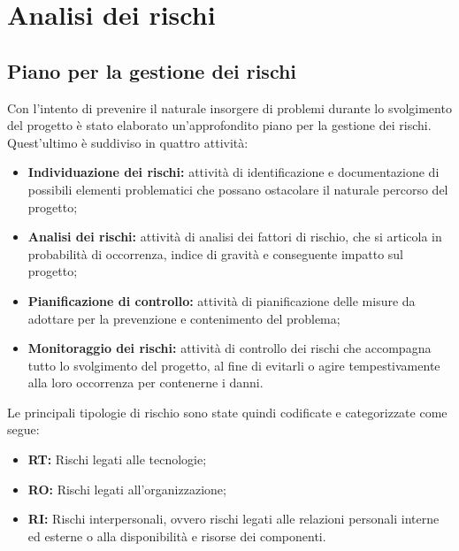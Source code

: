 \chapter{Analisi dei rischi}

\section{Piano per la gestione dei rischi}
Con l'intento di prevenire il naturale insorgere di problemi durante lo svolgimento del progetto è stato elaborato un'approfondito piano per la gestione dei rischi. Quest'ultimo è suddiviso in quattro attività:
\begin{itemize}
  \item \textbf{Individuazione dei rischi:} attività di identificazione e documentazione di possibili elementi problematici che possano ostacolare il naturale percorso del progetto;
  \item \textbf{Analisi dei rischi:} attività di analisi dei fattori di rischio, che si articola in probabilità di occorrenza, indice di gravità e conseguente impatto sul progetto;
  \item \textbf{Pianificazione di controllo:} attività di pianificazione delle misure da adottare per la prevenzione e contenimento del problema;
  \item \textbf{Monitoraggio dei rischi:} attività di controllo dei rischi che accompagna tutto lo svolgimento del progetto, al fine di evitarli o agire tempestivamente alla loro occorrenza per contenerne i danni.
\end{itemize}
Le principali tipologie di rischio sono state quindi codificate e categorizzate come segue:
\begin{itemize}
  \item \textbf{RT:} Rischi legati alle tecnologie;
  \item \textbf{RO:} Rischi legati all'organizzazione;
  \item \textbf{RI:} Rischi interpersonali, ovvero rischi legati alle relazioni personali interne ed esterne o alla disponibilità e risorse dei componenti.
\end{itemize}
